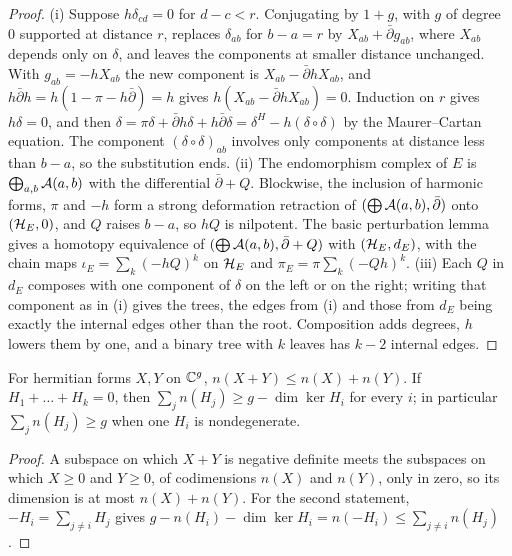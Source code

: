 \begin{proof}
(i) Suppose $h\delta_{cd}=0$ for $d-c<r$. Conjugating by $1+g$, with $g$ of
degree $0$ supported at distance $r$, replaces $\delta_{ab}$ for $b-a=r$ by
$X_{ab}+\bar\partial g_{ab}$, where $X_{ab}$ depends only on $\delta$, and
leaves the components at smaller distance unchanged. With
$g_{ab}=-hX_{ab}$ the new component is $X_{ab}-\bar\partial hX_{ab}$, and
$h\bar\partial h=h(1-\pi-h\bar\partial)=h$ gives $h(X_{ab}-\bar\partial
hX_{ab})=0$. Induction on $r$ gives $h\delta=0$, and then
$\delta=\pi\delta+\bar\partial h\delta+h\bar\partial\delta
=\delta^{H}-h(\delta\circ\delta)$ by the Maurer--Cartan equation. The
component $(\delta\circ\delta)_{ab}$ involves only components at distance
less than $b-a$, so the substitution ends.
(ii) The endomorphism complex of $E$ is $\bigoplus_{a,b}\mathcal{A}(a,b)$ with the
differential $\bar\partial+Q$. Blockwise, the inclusion of harmonic forms,
$\pi$ and $-h$ form a strong deformation retraction of
$(\bigoplus\mathcal{A}(a,b),\bar\partial)$ onto $(\mathcal{H}_{E},0)$, and $Q$ raises $b-a$,
so $hQ$ is nilpotent. The basic perturbation lemma gives a homotopy
equivalence of $(\bigoplus\mathcal{A}(a,b),\bar\partial+Q)$ with $(\mathcal{H}_{E},d_{E})$,
with the chain maps $\iota_{E}=\sum_{k}(-hQ)^{k}$ on $\mathcal{H}_{E}$ and
$\pi_{E}=\pi\sum_{k}(-Qh)^{k}$. (iii) Each $Q$ in $d_{E}$ composes with one
component of $\delta$ on the left or on the right; writing that component as
in (i) gives the trees, the edges from (i) and those from $d_{E}$ being
exactly the internal edges other than the root. Composition adds degrees,
$h$ lowers them by one, and a binary tree with $k$ leaves has $k-2$ internal
edges.
\end{proof}

\begin{lemma}\label{lem:indexsum}
For hermitian forms $X,Y$ on $\mathbb{C}^{g}$, $n(X+Y)\le n(X)+n(Y)$. If
$H_{1}+\dots+H_{k}=0$, then $\sum_{j}n(H_{j})\ge g-\dim\ker H_{i}$ for every
$i$; in particular $\sum_{j}n(H_{j})\ge g$ when one $H_{i}$ is
nondegenerate.
\end{lemma}

\begin{proof}
A subspace on which $X+Y$ is negative definite meets the subspaces on which
$X\ge0$ and $Y\ge0$, of codimensions $n(X)$ and $n(Y)$, only in zero, so its
dimension is at most $n(X)+n(Y)$. For the second statement,
$-H_{i}=\sum_{j\ne i}H_{j}$ gives
$g-n(H_{i})-\dim\ker H_{i}=n(-H_{i})\le\sum_{j\ne i}n(H_{j})$.
\end{proof}

